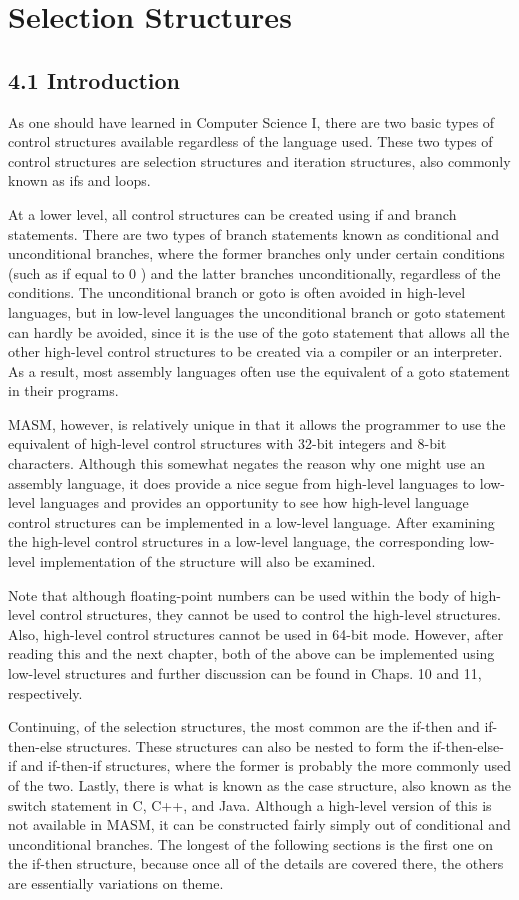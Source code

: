 \documentclass[10pt]{article}
\begin{document}
\section*{Selection Structures}
\subsection*{4.1 Introduction}
As one should have learned in Computer Science I, there are two basic types of control structures available regardless of the language used. These two types of control structures are selection structures and iteration structures, also commonly known as ifs and loops.

At a lower level, all control structures can be created using if and branch statements. There are two types of branch statements known as conditional and unconditional branches, where the former branches only under certain conditions (such as if equal to 0 ) and the latter branches unconditionally, regardless of the conditions. The unconditional branch or goto is often avoided in high-level languages, but in low-level languages the unconditional branch or goto statement can hardly be avoided, since it is the use of the goto statement that allows all the other high-level control structures to be created via a compiler or an interpreter. As a result, most assembly languages often use the equivalent of a goto statement in their programs.

MASM, however, is relatively unique in that it allows the programmer to use the equivalent of high-level control structures with 32-bit integers and 8-bit characters. Although this somewhat negates the reason why one might use an assembly language, it does provide a nice segue from high-level languages to low-level languages and provides an opportunity to see how high-level language control structures can be implemented in a low-level language. After examining the high-level control structures in a low-level language, the corresponding low-level implementation of the structure will also be examined.

Note that although floating-point numbers can be used within the body of high-level control structures, they cannot be used to control the high-level structures. Also, high-level control structures cannot be used in 64-bit mode. However, after reading this and the next chapter, both of the above can be implemented using low-level structures and further discussion can be found in Chaps. 10 and 11, respectively.

Continuing, of the selection structures, the most common are the if-then and if-then-else structures. These structures can also be nested to form the if-then-else-if and if-then-if structures, where the former is probably the more commonly used of the two. Lastly, there is what is known as the case structure, also known as the switch statement in C, C++, and Java. Although a high-level version of this is not available in MASM, it can be constructed fairly simply out of conditional and unconditional branches. The longest of the following sections is the first one on the if-then structure, because once all of the details are covered there, the others are essentially variations on theme.
\end{document}
